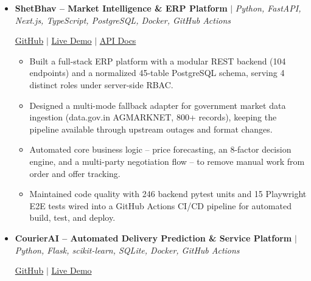 \documentclass[letterpaper,10pt]{article}
\newcommand{\resumeItem}[1]{
\item{#1 \vspace{1pt}}
}
\newcommand{\resumeProjectHeading}[1]{
\item #1\par\vspace{-2pt}
}
\begin{document}
\begin{itemize}[
leftmargin=0.18in,
itemsep=1pt,
topsep=0pt,
parsep=0pt,
partopsep=0pt
]

\resumeProjectHeading{
\textbf{ShetBhav -- Market Intelligence \& ERP Platform}
$|$ \textit{Python, FastAPI, Next.js, TypeScript, PostgreSQL, Docker, GitHub Actions}
}

\vspace{1pt}

\href{https://github.com/suman2308/market-intelligence-for-farmer}{GitHub}
$|$
\href{https://market-intelligence-for-farmer.vercel.app}{Live Demo}
$|$
\href{https://shetbhav-backend.onrender.com/docs}{API Docs}

\vspace{1pt}

\begin{itemize}[
leftmargin=0.2in,
itemsep=1pt,
topsep=0pt,
parsep=0pt,
partopsep=0pt
]

\resumeItem{Built a full-stack ERP platform with a modular REST backend (104 endpoints) and a normalized 45-table PostgreSQL schema, serving 4 distinct roles under server-side RBAC.}
\resumeItem{Designed a multi-mode fallback adapter for government market data ingestion (data.gov.in AGMARKNET, 800+ records), keeping the pipeline available through upstream outages and format changes.}
\resumeItem{Automated core business logic -- price forecasting, an 8-factor decision engine, and a multi-party negotiation flow -- to remove manual work from order and offer tracking.}
\resumeItem{Maintained code quality with 246 backend pytest units and 15 Playwright E2E tests wired into a GitHub Actions CI/CD pipeline for automated build, test, and deploy.}

\end{itemize}

\resumeProjectHeading{
\textbf{CourierAI -- Automated Delivery Prediction \& Service Platform}
$|$ \textit{Python, Flask, scikit-learn, SQLite, Docker, GitHub Actions}
}

\vspace{1pt}

\href{https://github.com/suman2308/smart-delivery-prediction}{GitHub}
$|$
\href{https://smart-delivery-prediction.onrender.com/}{Live Demo}

\vspace{1pt}

\begin{itemize}[
leftmargin=0.2in,
itemsep=1pt,
topsep=0pt,
parsep=0pt,
partopsep=0pt
]


\end{itemize}
\end{itemize}
\end{document}
